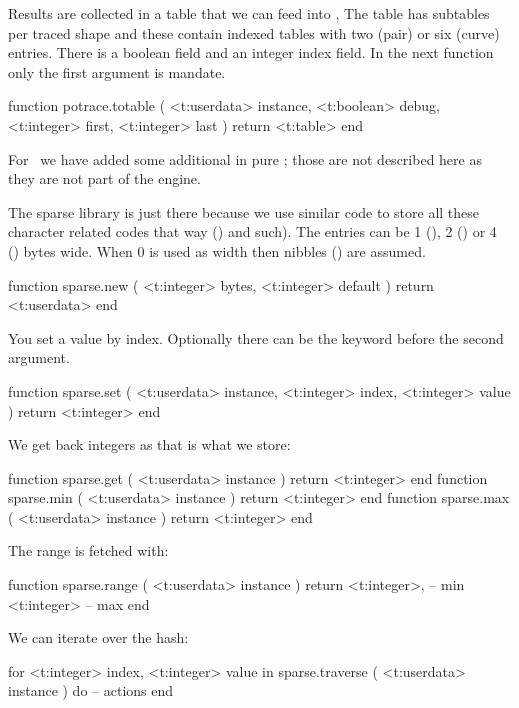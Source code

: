 Results are collected in a table that we can feed into \METAPOST, The table has
subtables per traced shape and these contain indexed tables with two (pair) or
six (curve) entries. There is a boolean  field and an integer \type
{index} field. In the next function only the first argument is mandate.

\starttyping[option=LUA]
function potrace.totable  (
    <t:userdata> instance,
    <t:boolean>  debug,
    <t:integer>  first,
    <t:integer>  last
)
    return <t:table>
end
\stoptyping

For \LUAMETAFUN\ we have added some additional in pure \LUA; those are not
described here as they are not part of the engine.

\stopsubsection

\startsubsection[title=Sparse hashes]

The sparse library is just there because we use similar code to store all these
character related codes that way (\type {\lccode}) and such). The entries can be
1 (), 2 () or 4 () bytes wide. When 0
is used as width then nibbles () are assumed.

\starttyping[option=LUA]
function sparse.new (
    <t:integer> bytes,
    <t:integer> default
)
    return <t:userdata>
end
\stoptyping

You set a value by index. Optionally there can be the  keyword
before the second argument.

\starttyping[option=LUA]
function sparse.set (
    <t:userdata> instance,
    <t:integer>  index,
    <t:integer>  value
)
    return <t:integer>
end
\stoptyping

We get back integers as that is what we store:

\starttyping[option=LUA]
function sparse.get ( <t:userdata> instance ) return <t:integer> end
function sparse.min ( <t:userdata> instance ) return <t:integer> end
function sparse.max ( <t:userdata> instance ) return <t:integer> end
\stoptyping

The range is fetched with:

\starttyping[option=LUA]
function sparse.range ( <t:userdata> instance )
    return
        <t:integer>, -- min
        <t:integer>  -- max
end
\stoptyping

We can iterate over the hash:

\starttyping[option=LUA]
for
    <t:integer> index,
    <t:integer> value
in sparse.traverse (
    <t:userdata> instance
) do
    -- actions
end
\stoptyping

